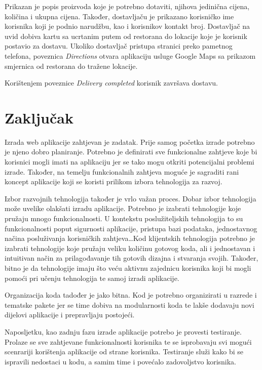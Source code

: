 \documentclass[times, utf8, zavrsni, numeric]{fer}
\begin{document}
Prikazan je popis proizvoda koje je potrebno dotaviti, njihova jedinična cijena, količina i ukupna cijena. Također, dostavljaču je prikazano korisničko ime korisnika koji je podnio narudžbu, kao i korisnikov kontakt broj. Dostavljač na uvid dobiva kartu sa ucrtanim putem od restorana do lokacije koje je korisnik postavio za dostavu. Ukoliko dostavljač pristupa stranici preko pametnog telefona, poveznica \emph{Directions} otvara aplikaciju usluge Google Maps sa prikazom smjernica od restorana do  tražene lokacije.

Korištenjem  poveznice \emph{Delivery completed} korisnik završava dostavu.
\chapter{Zaključak}
Izrada web aplikacije zahtjevan je zadatak. Prije samog početka izrade potrebno je njeno dobro planiranje. Potrebno je definirati sve funkcionalne zahtjeve koje bi korisnici mogli imati na aplikaciju jer se tako mogu otkriti potencijalni problemi izrade. Također, na temelju funkcionalnih zahtjeva moguće je sagraditi rani koncept aplikacije koji se koristi prilikom izbora tehnologija za razvoj. 

Izbor razvojnih tehnologija također je vrlo važan proces. Dobar izbor tehnologija može uvelike olakšati izradu aplikacije. Potrebno je izabrati tehnologije koje pružaju mnogo funkcionalnosti. U kontekstu poslužiteljskih tehnologija to su funkcionalnosti poput sigurnosti aplikacije, pristupa bazi podataka, jednostavnog načina posluživanja korisničkih zahtjeva\ldots Kod klijentskih tehnologija potrebno je izabrati tehnologije koje pružaju veliku količinu gotovog koda, ali i jednostavan i intuitivan način za prilagođavanje tih gotovih dizajna i stvaranja svojih. Također, bitno je da tehnologije imaju što veću aktivnu zajednicu korisnika koji bi mogli pomoći pri učenju tehnologija te samoj izradi aplikacije.

Organizacija koda tadođer je jako bitna. Kod je potrebno organizirati u razrede i tematske pakete jer se time dobiva na modularnosti koda te lakše dodavaju novi dijelovi aplikacije i prepravljaju postojeći.

Naposljetku, kao zadnju fazu izrade aplikacije potrebo je provesti testiranje. Prolaze se sve zahtjevane funkcionalnosti korisnika te se isprobavaju svi mogući scenrariji korištenja aplikacije od strane korisnika. Testiranje služi kako bi se ispravili nedostaci u kodu, a samim time i povećalo zadovoljstvo korisnika.\\
\end{document}
